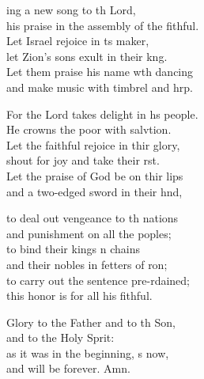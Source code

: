 \settowidth{\versewidth}{his praise in the assembly of the faithful.}
\begin{psalmverse}%
  \begin{patverse}
    ing a new song to th Lord,\Med\\
his praise in the assembly of the fithful.\\
Let Israel rejoice in \pointup{\i}ts maker,\Med\\
let Zion’s sons exult in their k\pointup{\i}ng.\\
Let them praise his name w\pointup{\i}th dancing\Med\\
and make music with timbrel and hrp.

For the Lord takes delight in h\pointup{\i}s people.\Med\\
He crowns the poor with salvtion.\\
Let the faithful rejoice in thir glory,\Med\\
shout for joy and take their rst.\\
Let the praise of God be on thir lips\Med\\
and a two-edged sword in their hnd,

to deal out vengeance to th nations\Med\\
and punishment on all the poples;\\
to bind their kings \pointup{\i}n chains\Med\\
and their nobles in fetters of \pointup{\i}ron;\\
to carry out the sentence pre-rdained;\Med\\
this honor is for all his fithful.

Glory to the Father and to th Son,\Med\\
and to the Holy Sp\pointup{\i}rit:\\
as it was in the beginning, \pointup{\i}s now,\Med\\
and will be forever. Amn.
  \end{patverse}
\end{psalmverse}
